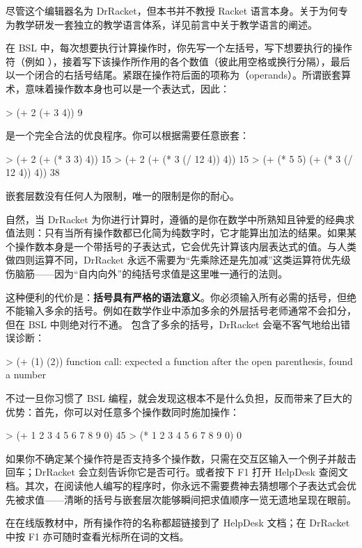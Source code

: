 \begin{notebox}
尽管这个编辑器名为 DrRacket，但本书并不教授 Racket 语言本身。关于为何专为教学研发一套独立的教学语言体系，详见前言中关于教学语言的阐述。
\end{notebox}

在 BSL 中，每次想要执行计算操作时，你先写一个左括号，写下想要执行的操作符（例如 \code{+}），接着写下该操作所作用的各个数值（彼此用空格或换行分隔），最后以一个闭合的右括号结尾。紧跟在操作符后面的项称为（operands）。所谓嵌套算术，意味着操作数本身也可以是一个表达式，因此：
\begin{replbox}
> (+ 2 (+ 3 4))
9
\end{replbox}
是一个完全合法的优良程序。你可以根据需要任意嵌套：
\begin{replbox}
> (+ 2 (+ (* 3 3) 4))
15
> (+ 2 (+ (* 3 (/ 12 4)) 4))
15
> (+ (* 5 5) (+ (* 3 (/ 12 4)) 4))
38
\end{replbox}
嵌套层数没有任何人为限制，唯一的限制是你的耐心。

自然，当 DrRacket 为你进行计算时，遵循的是你在数学中所熟知且钟爱的经典求值法则：只有当所有操作数都已化简为纯数字时，它才能算出加法的结果。如果某个操作数本身是一个带括号的子表达式，它会优先计算该内层表达式的值。与人类做四则运算不同，DrRacket 永远不需要为“先乘除还是先加减”这类运算符优先级伤脑筋——因为“自内向外”的纯括号求值是这里唯一通行的法则。

这种便利的代价是：\textbf{括号具有严格的语法意义}。你必须输入所有必需的括号，但绝不能输入多余的括号。例如在数学作业中添加多余的外层括号老师通常不会扣分，但在 BSL 中则绝对行不通。 包含了多余的括号，DrRacket 会毫不客气地给出错误诊断：
\begin{replbox}
> (+ (1) (2))
function call: expected a function after the open parenthesis, found a number
\end{replbox}
不过一旦你习惯了 BSL 编程，就会发现这根本不是什么负担，反而带来了巨大的优势：首先，你可以对任意多个操作数同时施加操作：
\begin{replbox}
> (+ 1 2 3 4 5 6 7 8 9 0)
45
> (* 1 2 3 4 5 6 7 8 9 0)
0
\end{replbox}
如果你不确定某个操作符是否支持多个操作数，只需在交互区输入一个例子并敲击回车；DrRacket 会立刻告诉你它是否可行。或者按下 F1 打开 HelpDesk 查阅文档。其次，在阅读他人编写的程序时，你永远不需要费神去猜想哪个子表达式会优先被求值——清晰的括号与嵌套层次能够瞬间把求值顺序一览无遗地呈现在眼前。

\begin{notebox}[提示]
在在线版教材中，所有操作符的名称都超链接到了 HelpDesk 文档；在 DrRacket 中按 F1 亦可随时查看光标所在词的文档。
\end{notebox}

